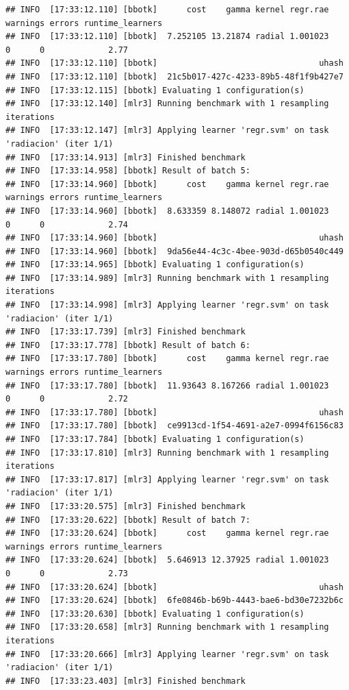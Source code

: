 \documentclass[
  11pt,
  a4paper,
]{article}
\begin{document}
\begin{verbatim}
## INFO  [17:33:12.110] [bbotk]      cost    gamma kernel regr.rae warnings errors runtime_learners
## INFO  [17:33:12.110] [bbotk]  7.252105 13.21874 radial 1.001023        0      0             2.77
## INFO  [17:33:12.110] [bbotk]                                 uhash
## INFO  [17:33:12.110] [bbotk]  21c5b017-427c-4233-89b5-48f1f9b427e7
## INFO  [17:33:12.115] [bbotk] Evaluating 1 configuration(s)
## INFO  [17:33:12.140] [mlr3] Running benchmark with 1 resampling iterations
## INFO  [17:33:12.147] [mlr3] Applying learner 'regr.svm' on task 'radiacion' (iter 1/1)
## INFO  [17:33:14.913] [mlr3] Finished benchmark
## INFO  [17:33:14.958] [bbotk] Result of batch 5:
## INFO  [17:33:14.960] [bbotk]      cost    gamma kernel regr.rae warnings errors runtime_learners
## INFO  [17:33:14.960] [bbotk]  8.633359 8.148072 radial 1.001023        0      0             2.74
## INFO  [17:33:14.960] [bbotk]                                 uhash
## INFO  [17:33:14.960] [bbotk]  9da56e44-4c3c-4bee-903d-d65b0540c449
## INFO  [17:33:14.965] [bbotk] Evaluating 1 configuration(s)
## INFO  [17:33:14.989] [mlr3] Running benchmark with 1 resampling iterations
## INFO  [17:33:14.998] [mlr3] Applying learner 'regr.svm' on task 'radiacion' (iter 1/1)
## INFO  [17:33:17.739] [mlr3] Finished benchmark
## INFO  [17:33:17.778] [bbotk] Result of batch 6:
## INFO  [17:33:17.780] [bbotk]      cost    gamma kernel regr.rae warnings errors runtime_learners
## INFO  [17:33:17.780] [bbotk]  11.93643 8.167266 radial 1.001023        0      0             2.72
## INFO  [17:33:17.780] [bbotk]                                 uhash
## INFO  [17:33:17.780] [bbotk]  ce9913cd-1f54-4691-a2e7-0994f6156c83
## INFO  [17:33:17.784] [bbotk] Evaluating 1 configuration(s)
## INFO  [17:33:17.810] [mlr3] Running benchmark with 1 resampling iterations
## INFO  [17:33:17.817] [mlr3] Applying learner 'regr.svm' on task 'radiacion' (iter 1/1)
## INFO  [17:33:20.575] [mlr3] Finished benchmark
## INFO  [17:33:20.622] [bbotk] Result of batch 7:
## INFO  [17:33:20.624] [bbotk]      cost    gamma kernel regr.rae warnings errors runtime_learners
## INFO  [17:33:20.624] [bbotk]  5.646913 12.37925 radial 1.001023        0      0             2.73
## INFO  [17:33:20.624] [bbotk]                                 uhash
## INFO  [17:33:20.624] [bbotk]  6fe0846b-b69b-4443-bae6-bd30e7232b6c
## INFO  [17:33:20.630] [bbotk] Evaluating 1 configuration(s)
## INFO  [17:33:20.658] [mlr3] Running benchmark with 1 resampling iterations
## INFO  [17:33:20.666] [mlr3] Applying learner 'regr.svm' on task 'radiacion' (iter 1/1)
## INFO  [17:33:23.403] [mlr3] Finished benchmark

\end{verbatim}
\end{document}
